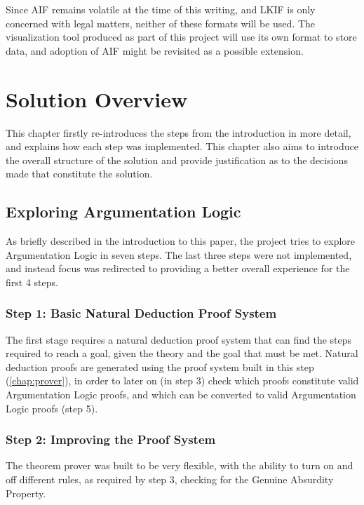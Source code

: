 \documentclass[11pt,twoside,a4paper]{report}
\begin{document}
Since AIF remains volatile at the time of this writing, and LKIF is only concerned with legal matters, neither of these formats will be used. The visualization tool produced as part of this project will use its own format to store data, and adoption of AIF might be revisited as a possible extension.

\chapter{Solution Overview}
\label{chap:solover}
This chapter firstly re-introduces the steps from the introduction in more detail, and explains how each step was implemented. This chapter also aims to introduce the overall structure of the solution and provide justification as to the decisions made that constitute the solution.

\section{Exploring Argumentation Logic}
\label{sec:exploration}
As briefly described in the introduction to this paper, the project tries to explore Argumentation Logic in seven steps. The last three steps were not implemented, and instead focus was redirected to providing a better overall experience for the first 4 steps.

\subsection{Step 1: Basic Natural Deduction Proof System}
The first stage requires a natural deduction proof system that can find the steps required to reach a goal, given the theory and the goal that must be met. Natural deduction proofs are generated using the proof system built in this step (\autoref{chap:prover}), in order to later on (in step 3) check which proofs constitute valid Argumentation Logic proofs, and which can be converted to valid Argumentation Logic proofs (step 5).

\subsection{Step 2: Improving the Proof System}
The theorem prover was built to be very flexible, with the ability to turn on and off different rules, as required by step 3, checking for the Genuine Absurdity Property.
\end{document}
